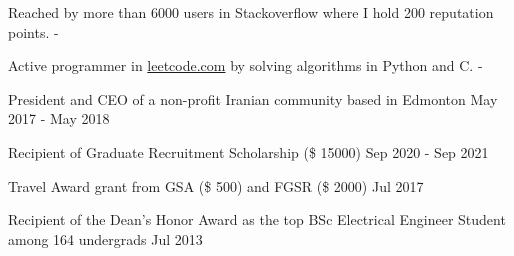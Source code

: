 \documentclass[letter,11pt]{article}
\begin{document}
Reached by more than 6000 users in Stackoverflow where I hold 200 reputation points. \hfill -

Active programmer in \href{www.leetcode.com}{leetcode.com}  by solving algorithms in Python and C. \hfill -

President and CEO of a non-profit Iranian community based in Edmonton \hfill May 2017 - May 2018

Recipient of Graduate Recruitment Scholarship (\$ 15000) \hfill Sep 2020 - Sep 2021

Travel Award grant from GSA (\$ 500) and FGSR (\$ 2000) \hfill Jul 2017

Recipient of the Dean's Honor Award as the top BSc Electrical Engineer Student among 164 undergrads \hfill Jul 2013
\end{document}
